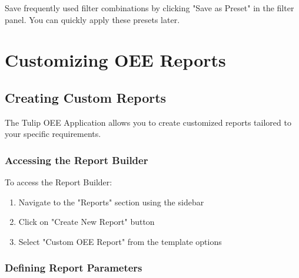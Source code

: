 \documentclass[12pt,a4paper]{report}
\newenvironment{tip}
  {\begin{tcolorbox}[colback=tuliplightgray,colframe=tulipgreen,title=Tip]}
  {\end{tcolorbox}}
\begin{document}
\begin{tip}
Save frequently used filter combinations by clicking "Save as Preset" in the filter panel. You can quickly apply these presets later.
\end{tip}

\chapter{Customizing OEE Reports}

\section{Creating Custom Reports}

The Tulip OEE Application allows you to create customized reports tailored to your specific requirements.

\subsection{Accessing the Report Builder}

To access the Report Builder:

\begin{enumerate}
    \item Navigate to the "Reports" section using the sidebar
    \item Click on "Create New Report" button
    \item Select "Custom OEE Report" from the template options
\end{enumerate}

\subsection{Defining Report Parameters}
\end{document}
